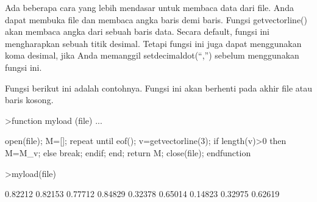 \documentclass[a4paper,10pt]{article}
\begin{document}
\begin{eulernotebook}
\begin{eulercomment}
\begin{eulercomment}
\begin{eulercomment}
\begin{eulercomment}
\begin{eulercomment}
\begin{eulercomment}
\begin{eulercomment}
\begin{eulercomment}
\begin{eulercomment}
\begin{eulercomment}
\begin{eulercomment}
\begin{eulercomment}
\begin{eulercomment}
\begin{eulercomment}
\begin{eulercomment}
\begin{eulercomment}
\begin{eulercomment}
\begin{eulercomment}
\begin{eulercomment}
\begin{eulercomment}
\begin{eulercomment}
\begin{eulercomment}
\begin{eulercomment}
\begin{eulercomment}
\begin{eulercomment}
\begin{eulercomment}
\begin{eulercomment}
\begin{eulercomment}
\begin{eulercomment}
\begin{eulercomment}
\begin{eulercomment}
\begin{eulercomment}
\begin{eulercomment}
\begin{eulercomment}
\begin{eulercomment}
\begin{eulercomment}
\begin{eulercomment}
\begin{eulercomment}
\begin{eulercomment}
\begin{eulercomment}
\begin{eulercomment}
\begin{eulercomment}
\begin{eulercomment}
\begin{eulercomment}
\begin{eulercomment}
\begin{eulercomment}
\begin{eulercomment}
\begin{eulercomment}
\begin{eulercomment}
\begin{eulercomment}
\begin{eulercomment}
Ada beberapa cara yang lebih mendasar untuk membaca data dari file.
Anda dapat membuka file dan membaca angka baris demi baris. Fungsi
getvectorline() akan membaca angka dari sebuah baris data. Secara
default, fungsi ini mengharapkan sebuah titik desimal. Tetapi fungsi
ini juga dapat menggunakan koma desimal, jika Anda memanggil
setdecimaldot(“,”) sebelum menggunakan fungsi ini.

Fungsi berikut ini adalah contohnya. Fungsi ini akan berhenti pada
akhir file atau baris kosong.
\end{eulercomment}
\begin{eulerprompt}
>function myload (file) ...
\end{eulerprompt}
\begin{eulerudf}
  open(file);
  M=[];
  repeat
     until eof();
     v=getvectorline(3);
     if length(v)>0 then M=M_v; else break; endif;
  end;
  return M;
  close(file);
  endfunction
\end{eulerudf}
\begin{eulerprompt}
>myload(file)
\end{eulerprompt}
\begin{euleroutput}
    0.82212   0.82153   0.77712 
    0.84829   0.32378   0.65014 
    0.14823   0.32975   0.62619 

\end{euleroutput}
\end{eulercomment}
\end{eulercomment}
\end{eulercomment}
\end{eulercomment}
\end{eulercomment}
\end{eulercomment}
\end{eulercomment}
\end{eulercomment}
\end{eulercomment}
\end{eulercomment}
\end{eulercomment}
\end{eulercomment}
\end{eulercomment}
\end{eulercomment}
\end{eulercomment}
\end{eulercomment}
\end{eulercomment}
\end{eulercomment}
\end{eulercomment}
\end{eulercomment}
\end{eulercomment}
\end{eulercomment}
\end{eulercomment}
\end{eulercomment}
\end{eulercomment}
\end{eulercomment}
\end{eulercomment}
\end{eulercomment}
\end{eulercomment}
\end{eulercomment}
\end{eulercomment}
\end{eulercomment}
\end{eulercomment}
\end{eulercomment}
\end{eulercomment}
\end{eulercomment}
\end{eulercomment}
\end{eulercomment}
\end{eulercomment}
\end{eulercomment}
\end{eulercomment}
\end{eulercomment}
\end{eulercomment}
\end{eulercomment}
\end{eulercomment}
\end{eulercomment}
\end{eulercomment}
\end{eulercomment}
\end{eulercomment}
\end{eulercomment}
\end{eulernotebook}
\end{document}
